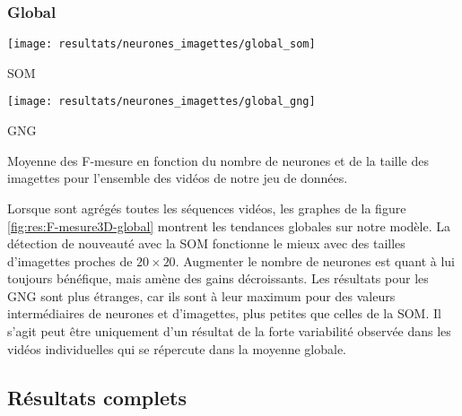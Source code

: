 	\subsubsection{Global}

	\begin{figureth}
		\begin{subfigureth}{.45\textwidth}
			\texttt{[image: resultats/neurones\_imagettes/global\_som]}\caption{SOM}
		\end{subfigureth}
		\begin{subfigureth}{.45\textwidth}
			\texttt{[image: resultats/neurones\_imagettes/global\_gng]}\caption{GNG}
		\end{subfigureth}
		\caption[Nombre de neurones et de taille des imagettes, Global]{Moyenne des F-mesure en fonction du nombre de neurones et de la taille des imagettes pour l'ensemble des vidéos de notre jeu de données.}\label{fig:res:F-mesure3D-global}
	\end{figureth}

	Lorsque sont agrégés toutes les séquences vidéos, les graphes de la figure \ref{fig:res:F-mesure3D-global} montrent les tendances globales sur notre modèle. La détection de nouveauté avec la SOM fonctionne le mieux avec des tailles d'imagettes proches de $20\times20$. Augmenter le nombre de neurones est quant à lui toujours bénéfique, mais amène des gains décroissants. Les résultats pour les GNG sont plus étranges, car ils sont à leur maximum pour des valeurs intermédiaires de neurones et d'imagettes, plus petites que celles de la SOM. Il s'agit peut être uniquement d'un résultat de la forte variabilité observée dans les vidéos individuelles qui se répercute dans la moyenne globale.

	\subsection{Résultats complets}\label{sec:res:stats}

